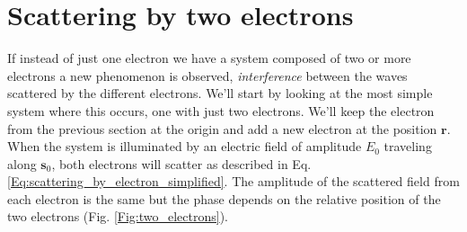 \section{Scattering by two electrons}\label{scat_two_electrons}

If instead of just one electron we have a system composed of two or more
electrons a new phenomenon is observed, {\em interference} between the waves
scattered by the different electrons. We'll start by looking at the most simple
system where this occurs, one with just two electrons. We'll keep the electron
from the previous section at the origin and add a new electron at the position
$\mathbf r$. When the system is illuminated by an electric field of amplitude $E_0$
traveling along $\mathbf s_0$, both electrons will scatter as described in
Eq. \ref{Eq:scattering_by_electron_simplified}. The amplitude of the scattered
field from each electron is the same but the phase depends on the relative position of
the two electrons (Fig. \ref{Fig:two_electrons}). 

